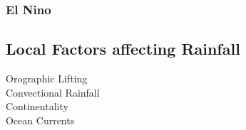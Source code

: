\documentclass[../../main]{subfiles}
\begin{document}
	\subsubsection{El Nino}

\subsection{Local Factors affecting Rainfall}

	\begin{description}
		\item[Orographic Lifting]
		\item[Convectional Rainfall]
		\item[Continentality]
		\item[Ocean Currents]
	\end{description}
\end{document}
